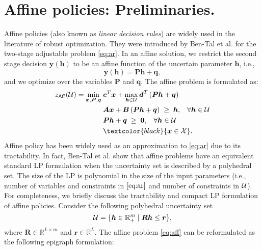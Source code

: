\documentclass[moor]{informs1}              %
\newcommand{\mb}[1]{\ensuremath{\boldsymbol{#1}}}
\newcommand*{\red}{\textcolor{black}}
\begin{document}
\section{Affine policies: Preliminaries.}
Affine policies (also known as {\em linear decision rules}) are widely used in the literature of robust optimization. They were introduced by Ben-Tal et al. \cite{Ben-Tal04} for the two-stage adjustable problem \eqref{eq:ar}. In an affine solution, we restrict the second stage decision $\mb y( \mb h )$ to be an affine function of the uncertain parameter $\mb h $, i.e., $$\mb y( \mb h )= \mb P \mb h + \mb q,$$ and we optimize over the variables $\mb P$ and $\mb q$. The affine problem is formulated as:
\begin{equation}\label{eq:aff}
\begin{aligned}
z_{\sf Aff}({\cal U}) = \min_{\mb x, \mb P, \mb q} \; & \mb{c}^T \mb{x} + \max_{\mb{h}\in {\cal U}}  \mb{d}^T\left( \mb{P}\mb{h}+\mb{q}\right) \\
& \mb{A}\mb{x} + \mb{B}\left( \mb{P}\mb{h}+\mb{q}\right) \; \geq \; \mb{h},   \; \; \; \forall \mb h \in {\cal U} \\
& \mb{P}\mb{h}+\mb{q} \; \geq \; \mb{0},   \; \; \; \forall \mb h \in {\cal U} \\
& \red{\mb{x}  \in  {\cal X} }.\\
\end{aligned}
\end{equation}
Affine policy has been widely used as an approximation to \eqref{eq:ar} due to its tractability. In fact, Ben-Tal et al. \cite{Ben-Tal04} show that affine problems have an equivalent standard LP formulation when the uncertainty set is described by a polyhedral set. The size of the LP is polynomial in the size of the input parameters (i.e.,  number of  variables and constraints in $\eqref{eq:ar}$ and number of constraints in $\cal U$). For completeness, we briefly discuss the tractability and compact LP formulation of affine policies. Consider the following polyhedral uncertainty set
\begin{equation} \label{def:U}
{\cal U}=\{\mb{h}\in{\mathbb R}^m_+\;|\;    \mb R \mb h \leq \mb r \},
\end{equation}
where $ \mb R \in \mathbb{R}^{L \times m}$ and $\mb r \in \mathbb{R}^L$. The affine problem \eqref{eq:aff} can be reformulated as the following epigraph formulation:
\end{document}

